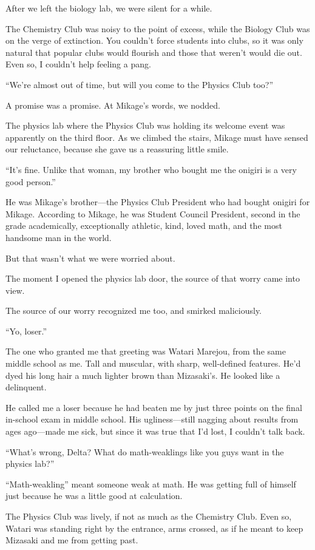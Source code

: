 \documentclass[
    a4paper,
    12pt,
    twoside,
    openany,
    UTF8,
    fontset=windows
]{ctexbook}
\begin{document}
After we left the biology lab, we were silent for a while.

The Chemistry Club was noisy to the point of excess, while the Biology Club was on the verge of extinction. You couldn't force students into clubs, so it was only natural that popular clubs would flourish and those that weren't would die out. Even so, I couldn't help feeling a pang.

``We're almost out of time, but will you come to the Physics Club too?''

A promise was a promise. At Mikage's words, we nodded.

The physics lab where the Physics Club was holding its welcome event was apparently on the third floor. As we climbed the stairs, Mikage must have sensed our reluctance, because she gave us a reassuring little smile.

``It's fine. Unlike that woman, my brother who bought me the onigiri is a very good person.''

He was Mikage's brother---the Physics Club President who had bought onigiri for Mikage. According to Mikage, he was Student Council President, second in the grade academically, exceptionally athletic, kind, loved math, and the most handsome man in the world.

But that wasn't what we were worried about.

The moment I opened the physics lab door, the source of that worry came into view.

The source of our worry recognized me too, and smirked maliciously.

``Yo, loser.''

The one who granted me that greeting was Watari Marejou, from the same middle school as me. Tall and muscular, with sharp, well-defined features. He'd dyed his long hair a much lighter brown than Mizasaki's. He looked like a delinquent.

He called me a loser because he had beaten me by just three points on the final in-school exam in middle school. His ugliness---still nagging about results from ages ago---made me sick, but since it was true that I'd lost, I couldn't talk back.

``What's wrong, Delta? What do math-weaklings like you guys want in the physics lab?''

``Math-weakling'' meant someone weak at math. He was getting full of himself just because he was a little good at calculation.

The Physics Club was lively, if not as much as the Chemistry Club. Even so, Watari was standing right by the entrance, arms crossed, as if he meant to keep Mizasaki and me from getting past.
\end{document}
